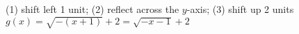 {(1) shift left 1 unit; (2) reflect across the $y$-axis; (3) shift up 2 units}
{$g(x) = \sqrt{-(x+1)} + 2 = \sqrt{-x-1} + 2$}